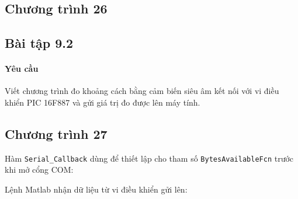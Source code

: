 \subsection*{Chương trình 26}

\subsection{Bài tập 9.2}
\paragraph{Yêu cầu}Viết chương trình đo khoảng cách bằng cảm biến siêu âm kết nối với vi điều khiển PIC 16F887 và gửi giá trị đo được lên máy tính.
\subsection*{Chương trình 27}


Hàm \verb|Serial_Callback| dùng để thiết lập cho tham số \verb|BytesAvailableFcn| trước khi mở cổng COM:


Lệnh Matlab nhận dữ liệu từ vi điều khiển gửi lên:


